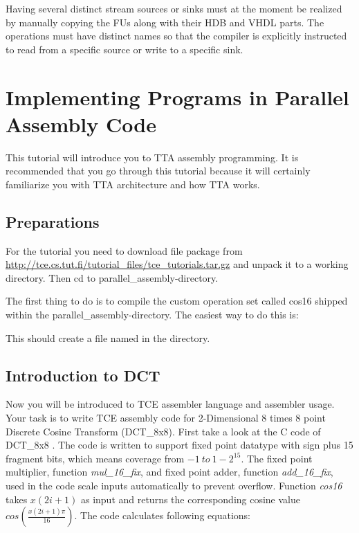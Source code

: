 \documentclass[twoside]{tceusermanual}
\begin{document}
Having several distinct stream sources or sinks must at the moment be realized
by manually copying the FUs along with their HDB and VHDL parts. The operations
must have distinct names so that the compiler is explicitly instructed to read
from a specific source or write to a specific sink.

\section{Implementing Programs in Parallel Assembly Code}
\label{section:parallelAssemblyCoding}

This tutorial will introduce you to TTA assembly programming. It is
recommended that you go through this tutorial because it will certainly
familiarize you with TTA architecture and how TTA works.

\subsection{Preparations}

For the tutorial you need to download file package from
\url{http://tce.cs.tut.fi/tutorial_files/tce_tutorials.tar.gz} and unpack it
to a working directory. Then cd to parallel\_assembly-directory.

The first thing to do is to compile the custom operation set called cos16 shipped
within the parallel\_assembly-directory. The easiest way to do this is:


This should create a file named  in the directory.

\subsection{Introduction to DCT}

Now you will be introduced to TCE assembler language and assembler usage.
Your task is to write TCE assembly code for 2-Dimensional 8 times 8 point 
Discrete Cosine Transform (DCT\_8x8).
First take a look at the C code of DCT\_8x8
.  
The code is written to support fixed point datatype with sign plus 15 fragment
bits, which means coverage from $-1\ to\ 1-2^{15}$. The fixed point
multiplier, function \textit{mul\_16\_fix}, and fixed point adder, function
\textit{add\_16\_fix},  used in the code scale inputs automatically to prevent
overflow. Function \textit{cos16} takes $x(2i+1)$ as input and returns
the corresponding cosine value $cos\left(\frac{x(2i+1)\pi}{16}\right)$. The code calculates
following equations:
\end{document}
